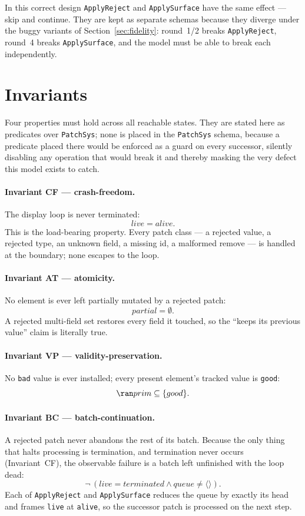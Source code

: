\documentclass[a4paper,10pt,fleqn]{article}
\begin{document}
In this correct design \texttt{ApplyReject} and \texttt{ApplySurface} have
the same effect --- skip and continue.  They are kept as separate schemas
because they diverge under the buggy variants of
Section~\ref{sec:fidelity}: round~1/2 breaks \texttt{ApplyReject}, round~4
breaks \texttt{ApplySurface}, and the model must be able to break each
independently.

\section{Invariants}
\label{sec:inv}

Four properties must hold across all reachable states.  They are stated
here as predicates over \texttt{PatchSys}; none is placed in the
\texttt{PatchSys} schema, because a predicate placed there would be enforced
as a guard on every successor, silently disabling any operation that would
break it and thereby masking the very defect this model exists to catch.

\paragraph{Invariant CF --- crash-freedom.}
The display loop is never terminated:
\[
  live = alive.
\]
This is the load-bearing property.  Every patch class --- a rejected value,
a rejected type, an unknown field, a missing id, a malformed remove --- is
handled at the boundary; none escapes to the loop.

\paragraph{Invariant AT --- atomicity.}
No element is ever left partially mutated by a rejected patch:
\[
  partial = \emptyset.
\]
A rejected multi-field set restores every field it touched, so the ``keeps
its previous value'' claim is literally true.

\paragraph{Invariant VP --- validity-preservation.}
No \texttt{bad} value is ever installed; every present element's tracked
value is \texttt{good}:
\[
  \ran prim \subseteq \{ good \}.
\]

\paragraph{Invariant BC --- batch-continuation.}
A rejected patch never abandons the rest of its batch.  Because the only
thing that halts processing is termination, and termination never occurs
(Invariant~CF), the observable failure is a batch left unfinished with the
loop dead:
\[
  \lnot\, (live = terminated \land queue \neq \langle \rangle).
\]
Each of \texttt{ApplyReject} and \texttt{ApplySurface} reduces the queue by
exactly its head and frames \texttt{live} at \texttt{alive}, so the
successor patch is processed on the next step.
\end{document}
